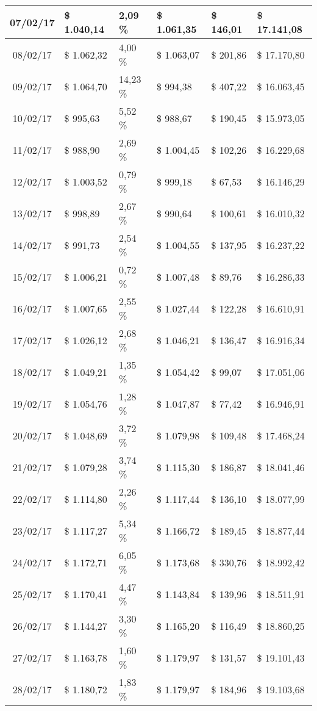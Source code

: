 \begin{small}
\begin{longtable}{|c|l|l|l|l|l|}
07/02/17 & \$ 1.040,14 & 2,09 \% & \$ 1.061,35 & \$ 146,01 & \$ 17.141,08 \\ \hline
08/02/17 & \$ 1.062,32 & 4,00 \% & \$ 1.063,07 & \$ 201,86 & \$ 17.170,80 \\ \hline
09/02/17 & \$ 1.064,70 & 14,23 \% & \$ 994,38 & \$ 407,22 & \$ 16.063,45 \\ \hline
10/02/17 & \$ 995,63 & 5,52 \% & \$ 988,67 & \$ 190,45 & \$ 15.973,05 \\ \hline
11/02/17 & \$ 988,90 & 2,69 \% & \$ 1.004,45 & \$ 102,26 & \$ 16.229,68 \\ \hline
12/02/17 & \$ 1.003,52 & 0,79 \% & \$ 999,18 & \$ 67,53 & \$ 16.146,29 \\ \hline
13/02/17 & \$ 998,89 & 2,67 \% & \$ 990,64 & \$ 100,61 & \$ 16.010,32 \\ \hline
14/02/17 & \$ 991,73 & 2,54 \% & \$ 1.004,55 & \$ 137,95 & \$ 16.237,22 \\ \hline
15/02/17 & \$ 1.006,21 & 0,72 \% & \$ 1.007,48 & \$ 89,76 & \$ 16.286,33 \\ \hline
16/02/17 & \$ 1.007,65 & 2,55 \% & \$ 1.027,44 & \$ 122,28 & \$ 16.610,91 \\ \hline
17/02/17 & \$ 1.026,12 & 2,68 \% & \$ 1.046,21 & \$ 136,47 & \$ 16.916,34 \\ \hline
18/02/17 & \$ 1.049,21 & 1,35 \% & \$ 1.054,42 & \$ 99,07 & \$ 17.051,06 \\ \hline
19/02/17 & \$ 1.054,76 & 1,28 \% & \$ 1.047,87 & \$ 77,42 & \$ 16.946,91 \\ \hline
20/02/17 & \$ 1.048,69 & 3,72 \% & \$ 1.079,98 & \$ 109,48 & \$ 17.468,24 \\ \hline
21/02/17 & \$ 1.079,28 & 3,74 \% & \$ 1.115,30 & \$ 186,87 & \$ 18.041,46 \\ \hline
22/02/17 & \$ 1.114,80 & 2,26 \% & \$ 1.117,44 & \$ 136,10 & \$ 18.077,99 \\ \hline
23/02/17 & \$ 1.117,27 & 5,34 \% & \$ 1.166,72 & \$ 189,45 & \$ 18.877,44 \\ \hline
24/02/17 & \$ 1.172,71 & 6,05 \% & \$ 1.173,68 & \$ 330,76 & \$ 18.992,42 \\ \hline
25/02/17 & \$ 1.170,41 & 4,47 \% & \$ 1.143,84 & \$ 139,96 & \$ 18.511,91 \\ \hline
26/02/17 & \$ 1.144,27 & 3,30 \% & \$ 1.165,20 & \$ 116,49 & \$ 18.860,25 \\ \hline
27/02/17 & \$ 1.163,78 & 1,60 \% & \$ 1.179,97 & \$ 131,57 & \$ 19.101,43 \\ \hline
28/02/17 & \$ 1.180,72 & 1,83 \% & \$ 1.179,97 & \$ 184,96 & \$ 19.103,68 \\ \hline

\end{longtable}
\end{small}
